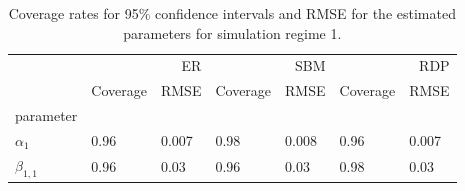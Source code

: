 \begin{table}[ht]
\centering
\caption{Coverage rates for 95\% confidence intervals and RMSE for the estimated parameters for simulation regime 1.}
\label{tab:regime_1_params}
\begin{tabular}{lllllll}
\toprule
 & \multicolumn{2}{r}{ER} & \multicolumn{2}{r}{SBM} & \multicolumn{2}{r}{RDP} \\
 & Coverage & RMSE & Coverage & RMSE & Coverage & RMSE \\
parameter &  &  &  &  &  &  \\
\midrule
$\alpha_{1}$ & 0.96 & 0.007 & 0.98 & 0.008 & 0.96 & 0.007 \\
$\beta_{1,1}$ & 0.96 & 0.03 & 0.96 & 0.03 & 0.98 & 0.03 \\
\bottomrule
\end{tabular}

\end{table}
